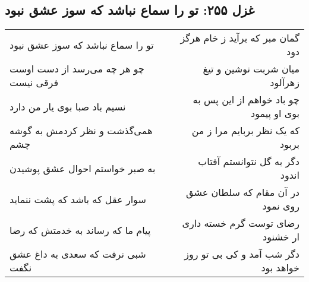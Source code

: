 \begin{center}
\section*{غزل ۲۵۵: تو را سماع نباشد که سوز عشق نبود}
\label{sec:255}
\begin{longtable}{l p{0.5cm} r}
تو را سماع نباشد که سوز عشق نبود
&&
گمان مبر که برآید ز خام هرگز دود
\\
چو هر چه می‌رسد از دست اوست فرقی نیست
&&
میان شربت نوشین و تیغ زهرآلود
\\
نسیم باد صبا بوی یار من دارد
&&
چو باد خواهم از این پس به بوی او پیمود
\\
همی‌گذشت و نظر کردمش به گوشه چشم
&&
که یک نظر بربایم مرا ز من بربود
\\
به صبر خواستم احوال عشق پوشیدن
&&
دگر به گل نتوانستم آفتاب اندود
\\
سوار عقل که باشد که پشت ننماید
&&
در آن مقام که سلطان عشق روی نمود
\\
پیام ما که رساند به خدمتش که رضا
&&
رضای توست گرم خسته داری ار خشنود
\\
شبی نرفت که سعدی به داغ عشق نگفت
&&
دگر شب آمد و کی بی تو روز خواهد بود
\\
\end{longtable}
\end{center}
